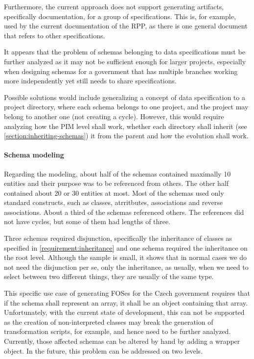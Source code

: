 Furthermore, the current approach does not support generating artifacts, specifically documentation, for a group of specifications. This is, for example, used by the current documentation of the RPP, as there is one general document that refers to other specifications.

It appears that the problem of schemas belonging to data specifications must be further analyzed as it may not be sufficient enough for larger projects, especially when designing schemas for a government that has multiple branches working more independently yet still needs to share specifications.

Possible solutions would include generalizing a concept of data specification to a project directory, where each schema belongs to one project, and the project may belong to another one (not creating a cycle). However, this would require analyzing how the PIM level shall work, whether each directory shall inherit (see \autoref{section:inheriting-schemas}) it from the parent and how the evolution shall work.

\paragraph{Schema modeling} Regarding the modeling, about half of the schemas contained maximally 10 entities and their purpose was to be referenced from others. The other half contained about 20 or 30 entities at most. Most of the schemas used only standard constructs, such as classes, atrritbutes, associations and reverse associations. About a third of the schemas referenced others. The references did not have cycles, but some of them had lengths of three.

Three schemas required disjunction, specifically the inheritance of classes as specified in \autoref{requirement:inheritance} and one schema required the inheritance on the root level. Although the sample is small, it shows that in normal cases we do not need the disjunction per se, only the inheritance, as usually, when we need to select between two different things, they are usually of the same type.

\smallskip

This specific use case of generating FOSes for the Czech government requires that if the schema shall represent an array, it shall be an object containing that array. Unfortunately, with the current state of development, this can not be supported as the creation of non-interpreted classes may break the generation of transformation scripts, for example, and hence need to be further analyzed. Currently, those affected schemas can be altered by hand by adding a wrapper object. In the future, this problem can be addressed on two levels.


